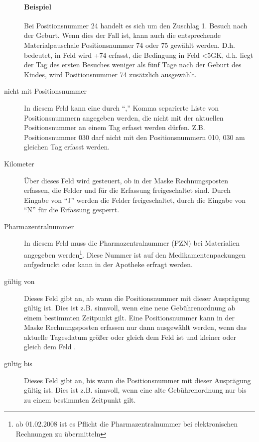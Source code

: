 \begin{description}
\paragraph{Beispiel}
Bei Positionsnummer 24 handelt es sich um den Zuschlag 1. Besuch nach der
Geburt. Wenn dies der Fall ist, kann auch die entsprechende Materialpauschale
Positionsnummer 74 oder 75 gewählt werden. D.h. bedeutet, in Feld
 wird +74 erfasst, die Bedingung in Feld 
 <5GK, d.h. liegt der Tag des ersten Besuches weniger
als fünf
Tage nach der Geburt des Kindes, wird Positionsnummer 74 zusätzlich ausgewählt.
\item[nicht mit Positionsnummer]
In diesem Feld kann eine durch ``,'' Komma separierte Liste von
Positionsnummern angegeben werden, die nicht mit der aktuellen Positionsnummer
an einem Tag erfasst werden dürfen. Z.B. Positionsnummer 030 darf nicht mit
den Positionsnummern 010, 030 am gleichen Tag erfasst werden.
\item[Kilometer]
Über dieses Feld wird gesteuert, ob in der Maske Rechnungsposten erfassen,
die Felder  und  für die Erfassung
freigeschaltet sind. Durch Eingabe von ``J'' werden die Felder freigeschaltet,
durch die Eingabe von ``N'' für die Erfassung gesperrt.
\item[Pharmazentralnummer]
In diesem Feld muss die Pharmazentralnummer (PZN) bei Materialien angegeben
werden\footnote{ab 01.02.2008 ist es Pflicht die Pharmazentralnummer bei 
elektronischen Rechnungen zu übermitteln}. Diese Nummer ist auf den
Medikamentenpackungen aufgedruckt oder kann in der Apotheke erfragt werden.
\item[gültig von]
Dieses Feld gibt an, ab wann die Positionsnummer mit dieser Ausprägung 
gültig ist. Dies ist z.B. sinnvoll, wenn eine neue Gebührenordnung ab
einem bestimmten Zeitpunkt gilt. Eine Positionsnummer kann in der Maske
Rechnungsposten erfassen nur dann ausgewählt werden, wenn das aktuelle
Tagesdatum größer oder gleich dem Feld  ist und kleiner
oder gleich dem Feld .
\item[gültig bis]
Dieses Feld gibt an, bis wann die Positionsnummer mit dieser Ausprägung 
gültig ist. Dies ist z.B. sinnvoll, wenn eine alte Gebührenordnung nur
bis zu einem bestimmten Zeitpunkt gilt.
\end{description}


